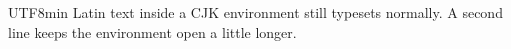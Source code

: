 \documentclass{article}
\begin{document}
\begin{CJK}{UTF8}{min}
Latin text inside a CJK environment still typesets normally.
A second line keeps the environment open a little longer.
\end{CJK}
\end{document}
